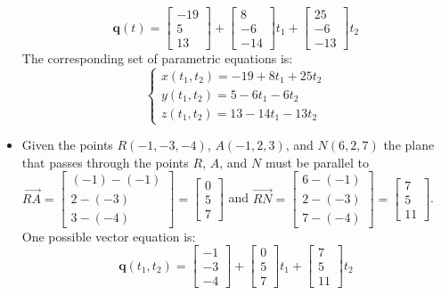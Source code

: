 \documentclass{article}
\begin{document}
\begin{itemize}
\[\mathbf{q}(t) = \begin{bmatrix} -19 \\ 5 \\ 13 \end{bmatrix} + \begin{bmatrix} 8 \\ -6 \\ -14 \end{bmatrix}t_1 + \begin{bmatrix} 25 \\ -6 \\ -13 \end{bmatrix}t_2\] 
The corresponding set of parametric equations is: 
\[\left\{\begin{array}{c} x(t_1, t_2) = -19 + 8t_1 + 25t_2 \\ y(t_1, t_2) = 5 - 6t_1 - 6t_2 \\ z(t_1, t_2) = 13 - 14t_1 - 13t_2 \end{array}\right.\]
\item Given the points \(R(-1, -3, -4)\), \(A(-1, 2, 3)\), and \(N(6, 2, 7)\) the plane that passes through the points \(R\), \(A\), and \(N\) must be parallel to \(\overrightarrow{RA} = \begin{bmatrix} (-1) - (-1) \\ 2 - (-3) \\ 3 - (-4) \end{bmatrix} = \begin{bmatrix} 0 \\ 5 \\ 7 \end{bmatrix}\) and \(\overrightarrow{RN} = \begin{bmatrix} 6 - (-1) \\ 2 - (-3) \\ 7 - (-4) \end{bmatrix} = \begin{bmatrix} 7 \\ 5 \\ 11 \end{bmatrix}\). One possible vector equation is:
\[\mathbf{q}(t_1, t_2) = \begin{bmatrix} -1 \\ -3 \\ -4 \end{bmatrix} + \begin{bmatrix} 0 \\ 5 \\ 7 \end{bmatrix}t_1 + \begin{bmatrix} 7 \\ 5 \\ 11 \end{bmatrix}t_2\] 

\end{itemize}
\end{document}
